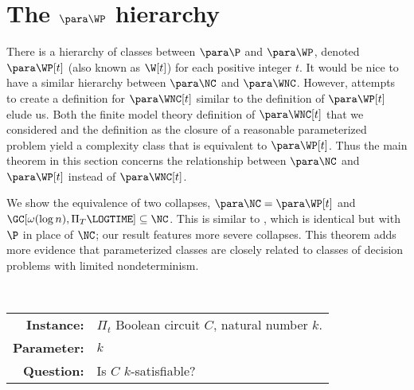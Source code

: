 \section{The \texorpdfstring{$\para \WP$}{paraWP} hierarchy}

%
%
%
There is a hierarchy of classes between $\para \P$ and $\para \WP$, denoted $\para \WP[t]$ (also known as $\W[t]$) for each positive integer $t$.
%
%
%
It would be nice to have a similar hierarchy between $\para \NC$ and $\para \WNC$.
However, attempts to create a definition for $\para \WNC[t]$ similar to the definition of $\para \WP[t]$ elude us.
%
%
%
Both the finite model theory definition of $\para \WNC[t]$ that we considered and the definition as the closure of a reasonable parameterized problem yield a complexity class that is equivalent to $\para \WP[t]$.
%
%
%
Thus the main theorem in this section concerns the relationship between $\para \NC$ and $\para \WP[t]$ instead of $\para \WNC[t]$.

%
%
%
We show the equivalence of two collapses, $\para \NC = \para \WP[t]$ and $\GC[\omega(\log n), \Pi_T \LOGTIME] \subseteq \NC$.
This is similar to \autocite[Theorem~4.3]{cc97npo}, which is identical but with $\P$ in place of $\NC$; our result features more severe collapses.
%
%
%
This theorem adds more evidence that parameterized classes are closely related to classes of decision problems with limited nondeterminism.
%
%


\begin{definition}
  \mbox{} \\
  \begin{tabular}{r p{9.2cm}}
    \textbf{Instance:} & $\Pi_t$ Boolean circuit $C$, natural number $k$. \\
    \textbf{Parameter:} & $k$ \\
    \textbf{Question:} & Is $C$ $k$-satisfiable?
  \end{tabular}
\end{definition}

